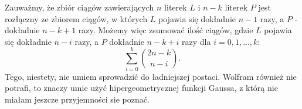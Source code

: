 \documentclass{article}
\begin{document}
Zauważmy, że zbiór ciągów zawierających $n$ literek $L$ i $n-k$ literek $P$ jest rozłączny ze zbiorem ciągów, w których $L$ pojawia się dokładnie $n-1$ razy, a $P$ - dokładnie $n-k+1$ razy. Możemy więc zsumować ilość ciągów, gdzie $L$ pojawia się dokładnie $n-i$ razy, a $P$ dokładnie $n-k+i$ razy dla $i=0,1,...,k$:
$$\sum\limits_{i=0}^k{2n-k\choose n-i}.$$
Tego, niestety, nie umiem sprowadzić do ładniejszej postaci. Wolfram również nie potrafi, to znaczy umie użyć hipergeometrycznej funkcji Gaussa, z którą nie miałam jeszcze przyjemności sie poznać.

\end{document}
